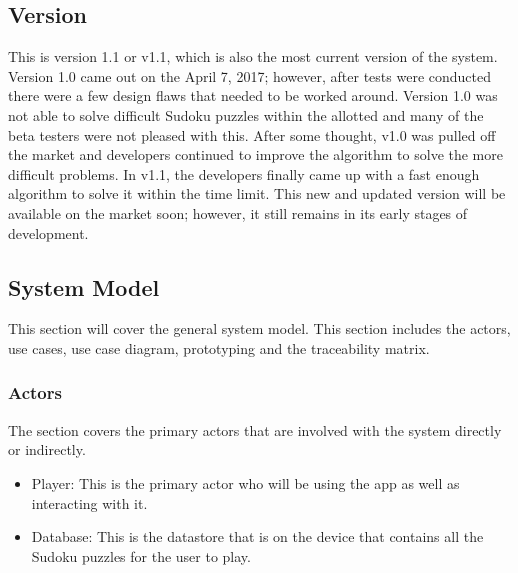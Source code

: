 \documentclass{article}
\begin{document}
\subsection{Version}
This is version 1.1 or v1.1, which is also the most current version of the system. Version 1.0 came out on the April 7, 2017; however, after tests were conducted there were a few design flaws that needed to be worked around. Version 1.0 was not able to solve difficult Sudoku puzzles within the allotted and many of the beta testers were not pleased with this. After some thought, v1.0 was pulled off the market and developers continued to improve the algorithm to solve the more difficult problems. In v1.1, the developers finally came up with a fast enough algorithm to solve it within the time limit. This new and updated version will be available on the market soon; however, it still remains in its early stages of development. 

\subsection{System Model}
This section will cover the general system model. This section includes the actors, use cases, use case diagram, prototyping and the traceability matrix.
\subsubsection{Actors}
The section covers the primary actors that are involved with the system directly or indirectly. \newline
\begin{itemize}
   \item Player: This is the primary actor who will be using the app as well as interacting with it.
   \item Database: This is the datastore that is on the device that contains all the Sudoku puzzles for the user to play.
\end{itemize}
\end{document}
